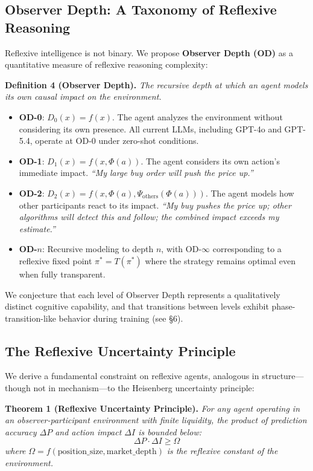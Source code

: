 \documentclass[11pt,a4paper]{article}
\begin{document}
\subsection{Observer Depth: A Taxonomy of Reflexive Reasoning}

Reflexive intelligence is not binary. We propose \textbf{Observer Depth (OD)} as a quantitative measure of reflexive reasoning complexity:

\vspace{0.3em}
\noindent\textbf{Definition 4 (Observer Depth).} \textit{The recursive depth at which an agent models its own causal impact on the environment.}
\vspace{0.3em}

\begin{itemize}[leftmargin=*]
\item \textbf{OD-0}: $D_0(x) = f(x)$. The agent analyzes the environment without considering its own presence. All current LLMs, including GPT-4o and GPT-5.4, operate at OD-0 under zero-shot conditions.
\item \textbf{OD-1}: $D_1(x) = f(x, \Phi(a))$. The agent considers its own action's immediate impact. \textit{``My large buy order will push the price up.''}
\item \textbf{OD-2}: $D_2(x) = f(x, \Phi(a), \Psi_{\text{others}}(\Phi(a)))$. The agent models how other participants react to its impact. \textit{``My buy pushes the price up; other algorithms will detect this and follow; the combined impact exceeds my estimate.''}
\item \textbf{OD-$n$}: Recursive modeling to depth $n$, with $\text{OD-}\infty$ corresponding to a reflexive fixed point $\pi^* = T(\pi^*)$ where the strategy remains optimal even when fully transparent.
\end{itemize}

We conjecture that each level of Observer Depth represents a qualitatively distinct cognitive capability, and that transitions between levels exhibit phase-transition-like behavior during training (see \S6).

\subsection{The Reflexive Uncertainty Principle}

We derive a fundamental constraint on reflexive agents, analogous in structure---though not in mechanism---to the Heisenberg uncertainty principle:

\vspace{0.3em}
\noindent\textbf{Theorem 1 (Reflexive Uncertainty Principle).} \textit{For any agent operating in an observer-participant environment with finite liquidity, the product of prediction accuracy $\Delta P$ and action impact $\Delta I$ is bounded below:}
\begin{equation}
\Delta P \cdot \Delta I \geq \Omega
\end{equation}
\textit{where} $\Omega = f(\text{position\_size}, \text{market\_depth})$ \textit{is the reflexive constant of the environment.}
\vspace{0.3em}
\end{document}
